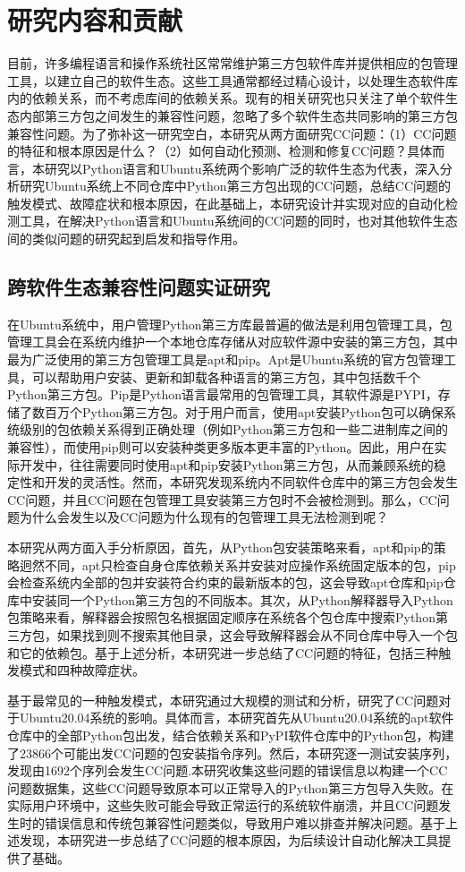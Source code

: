 \section{研究内容和贡献}
目前，许多编程语言和操作系统社区常常维护第三方包软件库并提供相应的包管理工具，以建立自己的软件生态。这些工具通常都经过精心设计，以处理生态软件库内的依赖关系，而不考虑库间的依赖关系。现有的相关研究也只关注了单个软件生态内部第三方包之间发生的兼容性问题，忽略了多个软件生态共同影响的第三方包兼容性问题。为了弥补这一研究空白，本研究从两方面研究CC问题：（1）CC问题的特征和根本原因是什么？（2）如何自动化预测、检测和修复CC问题？具体而言，本研究以Python语言和Ubuntu系统两个影响广泛的软件生态为代表，深入分析研究Ubuntu系统上不同仓库中Python第三方包出现的CC问题，总结CC问题的触发模式、故障症状和根本原因，在此基础上，本研究设计并实现对应的自动化检测工具，在解决Python语言和Ubuntu系统间的CC问题的同时，也对其他软件生态间的类似问题的研究起到启发和指导作用。
\subsection{跨软件生态兼容性问题实证研究}\label{1.3.1}
在Ubuntu系统中，用户管理Python第三方库最普遍的做法是利用包管理工具，包管理工具会在系统内维护一个本地仓库存储从对应软件源中安装的第三方包，其中最为广泛使用的第三方包管理工具是apt和pip。Apt是Ubuntu系统的官方包管理工具，可以帮助用户安装、更新和卸载各种语言的第三方包，其中包括数千个Python第三方包。Pip是Python语言最常用的包管理工具，其软件源是PYPI，存储了数百万个Python第三方包。对于用户而言，使用apt安装Python包可以确保系统级别的包依赖关系得到正确处理（例如Python第三方包和一些二进制库之间的兼容性），而使用pip则可以安装种类更多版本更丰富的Python。因此，用户在实际开发中，往往需要同时使用apt和pip安装Python第三方包，从而兼顾系统的稳定性和开发的灵活性。然而，本研究发现系统内不同软件仓库中的第三方包会发生CC问题，并且CC问题在包管理工具安装第三方包时不会被检测到。那么，CC问题为什么会发生以及CC问题为什么现有的包管理工具无法检测到呢？

本研究从两方面入手分析原因，首先，从Python包安装策略来看，apt和pip的策略迥然不同，apt只检查自身仓库依赖关系并安装对应操作系统固定版本的包，pip会检查系统内全部的包并安装符合约束的最新版本的包，这会导致apt仓库和pip仓库中安装同一个Python第三方包的不同版本。其次，从Python解释器导入Python包策略来看，解释器会按照包名根据固定顺序在系统各个包仓库中搜索Python第三方包，如果找到则不搜索其他目录，这会导致解释器会从不同仓库中导入一个包和它的依赖包。基于上述分析，本研究进一步总结了CC问题的特征，包括三种触发模式和四种故障症状。

基于最常见的一种触发模式，本研究通过大规模的测试和分析，研究了CC问题对于Ubuntu20.04系统的影响。具体而言，本研究首先从Ubuntu20.04系统的apt软件仓库中的全部Python包出发，结合依赖关系和PyPI软件仓库中的Python包，构建了23866个可能出发CC问题的包安装指令序列。然后，本研究逐一测试安装序列，发现由1692个序列会发生CC问题.本研究收集这些问题的错误信息以构建一个CC问题数据集，这些CC问题导致原本可以正常导入的Python第三方包导入失败。在实际用户环境中，这些失败可能会导致正常运行的系统软件崩溃，并且CC问题发生时的错误信息和传统包兼容性问题类似，导致用户难以排查并解决问题。基于上述发现，本研究进一步总结了CC问题的根本原因，为后续设计自动化解决工具提供了基础。
